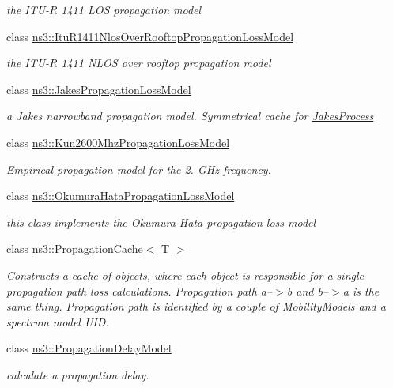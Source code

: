 \begin{DoxyCompactItemize}
\begin{DoxyCompactList}\small\item\em the I\+T\+U-\/R 1411 L\+OS propagation model \end{DoxyCompactList}\item 
class \hyperlink{classns3_1_1ItuR1411NlosOverRooftopPropagationLossModel}{ns3\+::\+Itu\+R1411\+Nlos\+Over\+Rooftop\+Propagation\+Loss\+Model}
\begin{DoxyCompactList}\small\item\em the I\+T\+U-\/R 1411 N\+L\+OS over rooftop propagation model \end{DoxyCompactList}\item 
class \hyperlink{classns3_1_1JakesPropagationLossModel}{ns3\+::\+Jakes\+Propagation\+Loss\+Model}
\begin{DoxyCompactList}\small\item\em a Jakes narrowband propagation model. Symmetrical cache for \hyperlink{classns3_1_1JakesProcess}{Jakes\+Process} \end{DoxyCompactList}\item 
class \hyperlink{classns3_1_1Kun2600MhzPropagationLossModel}{ns3\+::\+Kun2600\+Mhz\+Propagation\+Loss\+Model}
\begin{DoxyCompactList}\small\item\em Empirical propagation model for the 2. G\+Hz frequency. \end{DoxyCompactList}\item 
class \hyperlink{classns3_1_1OkumuraHataPropagationLossModel}{ns3\+::\+Okumura\+Hata\+Propagation\+Loss\+Model}
\begin{DoxyCompactList}\small\item\em this class implements the Okumura Hata propagation loss model \end{DoxyCompactList}\item 
class \hyperlink{classns3_1_1PropagationCache}{ns3\+::\+Propagation\+Cache$<$ T $>$}
\begin{DoxyCompactList}\small\item\em Constructs a cache of objects, where each object is responsible for a single propagation path loss calculations. Propagation path a--$>$b and b--$>$a is the same thing. Propagation path is identified by a couple of Mobility\+Models and a spectrum model U\+ID. \end{DoxyCompactList}\item 
class \hyperlink{classns3_1_1PropagationDelayModel}{ns3\+::\+Propagation\+Delay\+Model}
\begin{DoxyCompactList}\small\item\em calculate a propagation delay. \end{DoxyCompactList}\item 

\end{DoxyCompactItemize}
